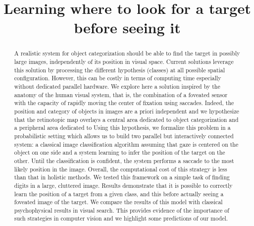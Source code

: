 \documentclass[a4]{article}
\title{
Learning where to look for a target before seeing it
}
\author{}
\begin{document}
\maketitle

\begin{abstract}
A realistic system for object categorization should be able to find the target in possibly large images, independently of its position in visual space. Current solutions leverage this solution by processing the different hypothesis (classes) at all possible spatial configuration. However, this can be costly in terms of computing time especially without dedicated parallel hardware. %
We explore here a solution inspired by the anatomy of the human visual system, that is, the combination of a foveated sensor with the capacity of rapidly moving the center of fixation using saccades. Indeed, the position and category of objects in images are a priori independent and we hypothesize that the retinotopic map overlays a central area dedicated to object categorization and a peripheral area dedicated to
Using this hypothesis, we formalize this problem in a probabilistic setting which allows us to build two parallel but interactively connected system: a classical image classification algorithm assuming that gaze is centered on the object on one side and a system learning to infer the position of the target on the other. Until the classification is confident, the system performs a saccade to the most likely position in the image. Overall, the computational cost of this strategy is less than that in holistic methods. %
We tested this framework on a simple task of finding digits in a large, cluttered image. Results demonstrate that it is possible to correctly learn the position of a target from a given class, and this before actually seeing a foveated image of the target. We compare the results of this model with classical psychophysical results in visual search. This provides evidence of the importance of such strategies in computer vision and we highlight some predictions of our model.
\end{abstract}










\end{document}
